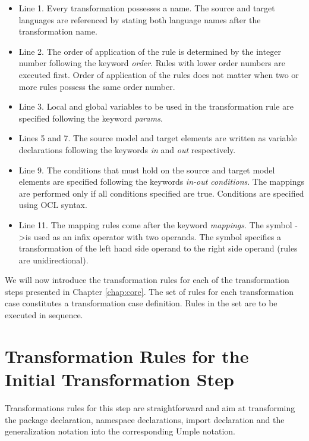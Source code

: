 \begin{itemize}

\item Line 1. Every transformation possesses a name. The source and target languages are referenced by stating both language names after the transformation name.

\item Line 2. The order of application of the rule is determined by the integer number following the keyword \textit{order}. Rules with lower order numbers are executed first. Order of application of the rules does not matter when two or more rules possess the same order number. 

\item Line 3. Local and global variables to be used in the transformation rule are specified following the keyword \textit{params}.

\item Lines 5 and 7. The source model and target elements are written as variable declarations following the keywords \textit{in} and \textit{out} respectively.

\item Line 9. The conditions that must hold on the source and target model elements are specified following the keywords \textit{in-out conditions}. The mappings are performed only if all conditions specified are true. Conditions are specified using OCL syntax. 

\item Line 11. The mapping rules come after the keyword \textit{mappings}. The symbol -\textgreater \newline is used as an infix operator with two operands. The symbol specifies a transformation of the left hand side operand to the right side operand (rules are unidirectional).
\end{itemize}

We will now introduce the transformation rules for each of the transformation steps presented in Chapter \ref{chap:core}.
The set of rules for each transformation case constitutes a transformation case definition. Rules in the set are to be executed in sequence.

\section{Transformation Rules for the Initial Transformation Step}

Transformations rules for this step are straightforward and aim at transforming the package declaration, namespace declarations, import declaration and the generalization notation into the corresponding Umple notation. 


